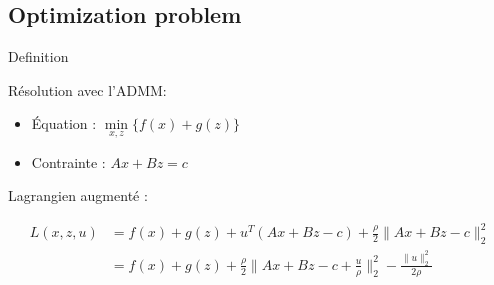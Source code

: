 \subsection{Optimization problem}

\frame{
    \tableofcontents[ 
        currentsubsection, 
    ]
}


\begin{frame}{Definition}

Résolution avec l'ADMM:
\begin{itemize}
    \item Équation : $\min\limits_{x, z} \{ f(x) + g(z) \}$
    \item Contrainte : $Ax + Bz = c$
\end{itemize}

\vspace{5mm}

Lagrangien augmenté :

\begin{align*}
L(x, z, u) 
&= f(x) + g(z) + u^{T}(Ax + Bz - c) 
+ \frac{\rho}{2} \lVert Ax + Bz - c \rVert_{2}^{2} \\
&= f(x) + g(z)
+ \frac{\rho}{2} \lVert Ax + Bz - c + \frac{u}{\rho} \rVert_{2}^{2}
- \frac{\lVert u \rVert_{2}^{2}}{2\rho} \\
\end{align*}

\end{frame}









